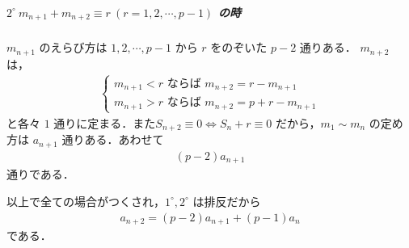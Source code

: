 \documentclass[../../main.tex]{subfiles}
\begin{document}
\subparagraph{$2^\circ\ m_{n+1} + m_{n+2} \equiv r\ (r=1, 2, \cdots, p-1)$ の時}

$m_{n+1}$ のえらび方は $1, 2, \cdots, p-1$ から $r$ をのぞいた $p-2$ 通りある．
$m_{n+2}$ は，
\begin{align}
  \begin{cases}
    m_{n+1} < r \text{ ならば } m_{n+2} = r - m_{n+1} \\
    m_{n+1} > r \text{ ならば } m_{n+2} = p + r - m_{n+1}
  \end{cases}
\end{align}
と各々 $1$ 通りに定まる．また$S_{n+2} \equiv 0 \iff S_n + r \equiv 0$ だから，$m_1 \sim m_n$ の定め方は $a_{n+1}$ 通りある．あわせて
\begin{align}
  (p-2) a_{n+1}
\end{align}
通りである．
\casesend

以上で全ての場合がつくされ，$1^\circ, 2^\circ$ は排反だから
\begin{align}
  a_{n+2} = (p-2)a_{n+1} + (p-1)a_n
\end{align}
である．
\end{document}
